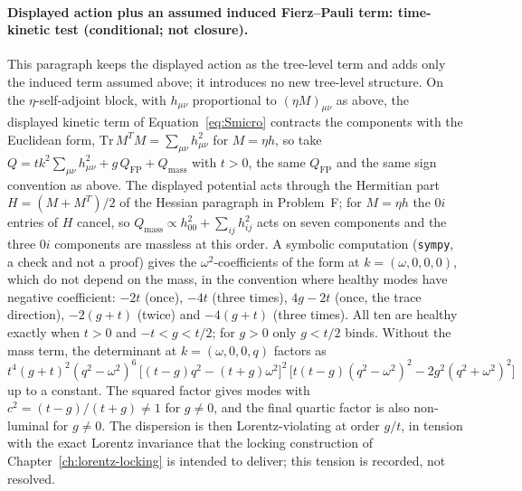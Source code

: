 \paragraph{Displayed action plus an assumed induced Fierz--Pauli term:
time-kinetic test (conditional; not closure).}
This paragraph keeps the displayed action as the tree-level term and
adds only the induced term assumed above; it introduces no new
tree-level structure.  On the \(\eta\)-self-adjoint block, with
\(h_{\mu\nu}\) proportional to \((\eta M)_{\mu\nu}\) as above, the
displayed kinetic term of Equation~\eqref{eq:Smicro} contracts the
components with the Euclidean form, \(\mathrm{Tr}\,M^{T}M=\sum_{\mu\nu}
h_{\mu\nu}^2\) for \(M=\eta h\), so take
\(Q=tk^2\sum_{\mu\nu}h_{\mu\nu}^2+g\,Q_{\mathrm{FP}}+Q_{\mathrm{mass}}\)
with \(t>0\), the same \(Q_{\mathrm{FP}}\) and the same sign convention
as above.  The displayed potential acts through the Hermitian part
\(H=(M+M^{T})/2\) of the Hessian paragraph in Problem~F; for \(M=\eta h\)
the \(0i\) entries of \(H\) cancel, so \(Q_{\mathrm{mass}}\propto
h_{00}^2+\sum_{ij}h_{ij}^2\) acts on seven components and the three
\(0i\) components are massless at this order.  A symbolic computation
(\texttt{sympy}, a check and not a proof) gives the
\(\omega^2\)-coefficients of the form at \(k=(\omega,0,0,0)\), which do not
depend on the mass, in the convention where healthy modes have negative
coefficient: \(-2t\) (once), \(-4t\) (three times), \(4g-2t\) (once, the
trace direction), \(-2(g+t)\) (twice) and \(-4(g+t)\) (three times).  All
ten are healthy exactly when \(t>0\) and \(-t<g<t/2\); for \(g>0\) only
\(g<t/2\) binds.  Without the mass term, the determinant at
\(k=(\omega,0,0,q)\) factors as
\(t^4(g+t)^2(q^2-\omega^2)^6\,
\bigl[(t-g)q^2-(t+g)\omega^2\bigr]^2\,
\bigl[t(t-g)(q^2-\omega^2)^2-2g^2(q^2+\omega^2)^2\bigr]\)
up to a constant.  The squared factor gives modes with
\(c^2=(t-g)/(t+g)\neq1\) for \(g\neq0\), and the final quartic factor is
also non-luminal for \(g\neq0\).  The dispersion is then
Lorentz-violating at order \(g/t\), in tension with the exact Lorentz
invariance that the locking construction of
Chapter~\ref{ch:lorentz-locking} is intended to deliver; this tension is
recorded, not resolved.

